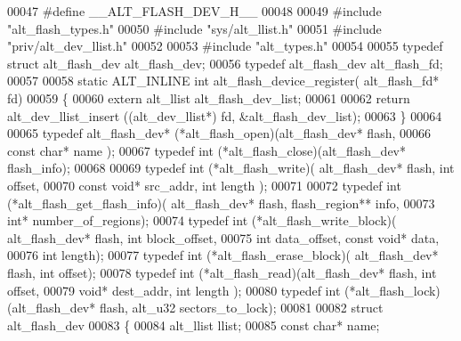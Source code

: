 \begin{DoxyCode}
00047 \textcolor{preprocessor}{#define \_\_ALT\_FLASH\_DEV\_H\_\_}
00048 
00049 \textcolor{preprocessor}{#include "alt_flash_types.h"}
00050 \textcolor{preprocessor}{#include "sys/alt_llist.h"}
00051 \textcolor{preprocessor}{#include "priv/alt_dev_llist.h"}
00052 
00053 \textcolor{preprocessor}{#include "alt_types.h"}
00054 
00055 \textcolor{keyword}{typedef} \textcolor{keyword}{struct }alt_flash_dev alt_flash_dev; 
00056 \textcolor{keyword}{typedef} alt_flash_dev alt_flash_fd;
00057 
00058 \textcolor{keyword}{static} ALT_INLINE \textcolor{keywordtype}{int} alt_flash_device_register( alt_flash_fd* fd)
00059 \{
00060   \textcolor{keyword}{extern} alt_llist alt\_flash\_dev\_list;
00061 
00062   \textcolor{keywordflow}{return} alt_dev_llist_insert ((alt_dev_llist*) fd, &alt\_flash\_dev\_list);
00063 \}
00064 
00065 \textcolor{keyword}{typedef} alt_flash_dev* (*alt\_flash\_open)(alt_flash_dev* flash, 
00066                                          \textcolor{keyword}{const} \textcolor{keywordtype}{char}* name );
00067 \textcolor{keyword}{typedef} int (*alt_flash_close)(alt_flash_dev* flash\_info);
00068 
00069 \textcolor{keyword}{typedef} int (*alt_flash_write)( alt_flash_dev* flash, \textcolor{keywordtype}{int} offset, 
00070                                 \textcolor{keyword}{const} \textcolor{keywordtype}{void}* src_addr, \textcolor{keywordtype}{int} length );
00071 
00072 \textcolor{keyword}{typedef} int (*alt_flash_get_flash_info)( alt_flash_dev* flash, flash_region** 
      info, 
00073                                           \textcolor{keywordtype}{int}* number_of_regions);
00074 \textcolor{keyword}{typedef} int (*alt_flash_write_block)( alt_flash_dev* flash, \textcolor{keywordtype}{int} block_offset, 
00075                                       \textcolor{keywordtype}{int} data_offset, \textcolor{keyword}{const} \textcolor{keywordtype}{void}* data, 
00076                                       \textcolor{keywordtype}{int} length);
00077 \textcolor{keyword}{typedef} int (*alt_flash_erase_block)( alt_flash_dev* flash, \textcolor{keywordtype}{int} offset);
00078 \textcolor{keyword}{typedef} int (*alt_flash_read)(alt_flash_dev* flash, \textcolor{keywordtype}{int} offset, 
00079                               \textcolor{keywordtype}{void}* dest_addr, \textcolor{keywordtype}{int} length );
00080 \textcolor{keyword}{typedef} int (*alt_flash_lock)(alt_flash_dev* flash, alt_u32 sectors_to_lock);                         
00081 
00082 \textcolor{keyword}{struct }alt_flash_dev
00083 \{
00084   alt_llist                 llist;
00085   \textcolor{keyword}{const} \textcolor{keywordtype}{char}*               name;

\end{DoxyCode}

